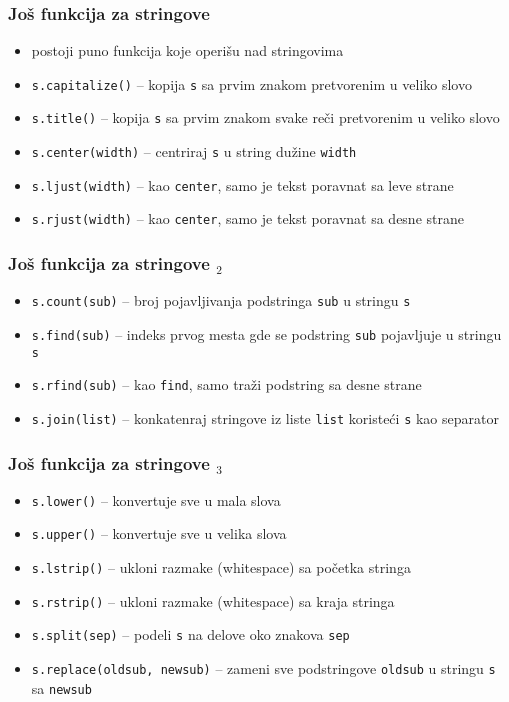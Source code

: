\documentclass[utf8,compress]{beamer}
\begin{document}
\begin{frame}[fragile]
  \frametitle{Još funkcija za stringove}
  \begin{itemize}
    \item postoji puno funkcija koje operišu nad stringovima
    \item \texttt{s.capitalize()} -- kopija \texttt{s} sa prvim znakom pretvorenim u veliko slovo
    \item \texttt{s.title()} -- kopija \texttt{s} sa prvim znakom svake reči pretvorenim u veliko slovo
    \item \texttt{s.center(width)} -- centriraj \texttt{s} u string dužine \texttt{width}
    \item \texttt{s.ljust(width)} -- kao \texttt{center}, samo je tekst poravnat sa leve strane
    \item \texttt{s.rjust(width)} -- kao \texttt{center}, samo je tekst poravnat sa desne strane
  \end{itemize}
\end{frame}

\begin{frame}[fragile]
  \frametitle{Još funkcija za stringove $_2$}
  \begin{itemize}
    \item \texttt{s.count(sub)} -- broj pojavljivanja podstringa \texttt{sub} u stringu \texttt{s}
    \item \texttt{s.find(sub)} -- indeks prvog mesta gde se podstring \texttt{sub} pojavljuje u stringu \texttt{s}
    \item \texttt{s.rfind(sub)} -- kao \texttt{find}, samo traži podstring sa desne strane
    \item \texttt{s.join(list)} -- konkatenraj stringove iz liste \texttt{list} koristeći \texttt{s} kao separator
  \end{itemize}
\end{frame}

\begin{frame}[fragile]
  \frametitle{Još funkcija za stringove $_3$}
  \begin{itemize}
    \item \texttt{s.lower()} -- konvertuje sve u mala slova
    \item \texttt{s.upper()} -- konvertuje sve u velika slova
    \item \texttt{s.lstrip()} -- ukloni razmake (whitespace) sa početka stringa
    \item \texttt{s.rstrip()} -- ukloni razmake (whitespace) sa kraja stringa
    \item \texttt{s.split(sep)} -- podeli \texttt{s} na delove oko znakova \texttt{sep}
    \item \texttt{s.replace(oldsub, newsub)} -- zameni sve podstringove \texttt{oldsub} u stringu \texttt{s} sa \texttt{newsub}
  \end{itemize}
\end{frame}
\end{document}
